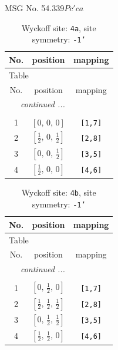 \documentclass[fleqn,8pt]{jsarticle}
\begin{document}
\setcounter{MaxMatrixCols}{32}

\renewcommand{\tablename}{Table~}
\renewcommand{\figurename}{Figure~}
\begin{center}
\LARGE
MSG No. 54.339\quad$Pc'ca$
\end{center}
\renewcommand{\arraystretch}{1.2}
\begin{longtable}{ccc}
\caption{Wyckoff site: {\tt 4a}, site symmetry: {\tt -1'}}
 \\
 \hline \hline
No. & position & mapping \\ \hline \endfirsthead

\multicolumn{2}{l}{\tablename\ \thetable{}} \\
 \hline \hline
No. & position & mapping \\ \hline \endhead

 \hline \hline
\multicolumn{2}{r}{\footnotesize\it continued ...} \\ \endfoot

 \hline \hline
\multicolumn{2}{r}{} \\ \endlastfoot

1 & $\left[ 0,\, 0,\, 0 \right]$ & {\tt [1,7]} \\ \hline
2 & $\left[ \frac{1}{2},\, 0,\, \frac{1}{2} \right]$ & {\tt [2,8]} \\ \hline
3 & $\left[ 0,\, 0,\, \frac{1}{2} \right]$ & {\tt [3,5]} \\ \hline
4 & $\left[ \frac{1}{2},\, 0,\, 0 \right]$ & {\tt [4,6]} \\
\end{longtable}
\renewcommand{\arraystretch}{1.2}
\begin{longtable}{ccc}
\caption{Wyckoff site: {\tt 4b}, site symmetry: {\tt -1'}}
 \\
 \hline \hline
No. & position & mapping \\ \hline \endfirsthead

\multicolumn{2}{l}{\tablename\ \thetable{}} \\
 \hline \hline
No. & position & mapping \\ \hline \endhead

 \hline \hline
\multicolumn{2}{r}{\footnotesize\it continued ...} \\ \endfoot

 \hline \hline
\multicolumn{2}{r}{} \\ \endlastfoot

1 & $\left[ 0,\, \frac{1}{2},\, 0 \right]$ & {\tt [1,7]} \\ \hline
2 & $\left[ \frac{1}{2},\, \frac{1}{2},\, \frac{1}{2} \right]$ & {\tt [2,8]} \\ \hline
3 & $\left[ 0,\, \frac{1}{2},\, \frac{1}{2} \right]$ & {\tt [3,5]} \\ \hline
4 & $\left[ \frac{1}{2},\, \frac{1}{2},\, 0 \right]$ & {\tt [4,6]} \\
\end{longtable}
\end{document}

